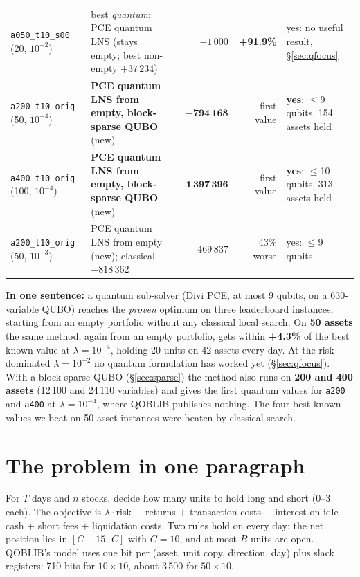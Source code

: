 \documentclass[11pt]{article}
\newcommand{\gapbad}[1]{\textcolor{bad}{\textbf{#1}}}
\begin{document}
\begin{center}
\begin{tabularx}{\textwidth}{@{}>{\raggedright\arraybackslash}p{40mm}Lrr>{\raggedright\arraybackslash}p{30mm}@{}}
\texttt{a050\_t10\_s00} (20, $10^{-2}$) & best \emph{quantum}: PCE quantum LNS (stays empty; best non-empty $+37\,234$) & $-1\,000$ & \gapbad{+91.9\%} & yes: no useful result, \S\ref{sec:qfocus}\\
\texttt{a200\_t10\_orig} (50, $10^{-4}$) & \textbf{PCE quantum LNS from empty, block-sparse QUBO} (new) & $\mathbf{-794\,168}$ & first value & \textbf{yes}: $\le$9 qubits, 154 assets held\\
\texttt{a400\_t10\_orig} (100, $10^{-4}$) & \textbf{PCE quantum LNS from empty, block-sparse QUBO} (new) & $\mathbf{-1\,397\,396}$ & first value & \textbf{yes}: $\le$10 qubits, 313 assets held\\
\texttt{a200\_t10\_orig} (50, $10^{-3}$) & PCE quantum LNS from empty (new); classical $-818\,362$ & $-469\,837$ & 43\% worse & yes: $\le$9 qubits\\
\bottomrule
\end{tabularx}
\end{center}

\noindent\textbf{In one sentence:} a quantum sub-solver (Divi PCE, at most 9 qubits, on a 630-variable
QUBO) reaches the \emph{proven} optimum on three leaderboard instances, starting from an empty
portfolio without any classical local search. On \textbf{50 assets} the same method, again from an
empty portfolio, gets within \textbf{+4.3\%} of the best known value at $\lambda=10^{-4}$, holding
20 units on 42 assets every day. At the risk-dominated $\lambda=10^{-2}$ no quantum formulation has
worked yet (\S\ref{sec:qfocus}). With a block-sparse QUBO (\S\ref{sec:sparse}) the method also runs on
\textbf{200 and 400 assets} (12\,100 and 24\,110 variables) and gives the first quantum values for
\texttt{a200} and \texttt{a400} at $\lambda=10^{-4}$, where QOBLIB publishes nothing. The four best-known
values we beat on 50-asset instances were beaten by classical search.

\section{The problem in one paragraph}
For $T$ days and $n$ stocks, decide how many units to hold long and short (0--3 each). The objective
is $\lambda\cdot$risk $-$ returns $+$ transaction costs $-$ interest on idle cash $+$ short fees $+$
liquidation costs. Two rules hold on every day: the net position lies in $[C-15,\,C]$ with $C=10$,
and at most $B$ units are open. QOBLIB's model uses one bit per (asset, unit copy, direction, day)
plus slack registers: 710 bits for $10\times10$, about 3\,500 for $50\times10$.
\end{document}
